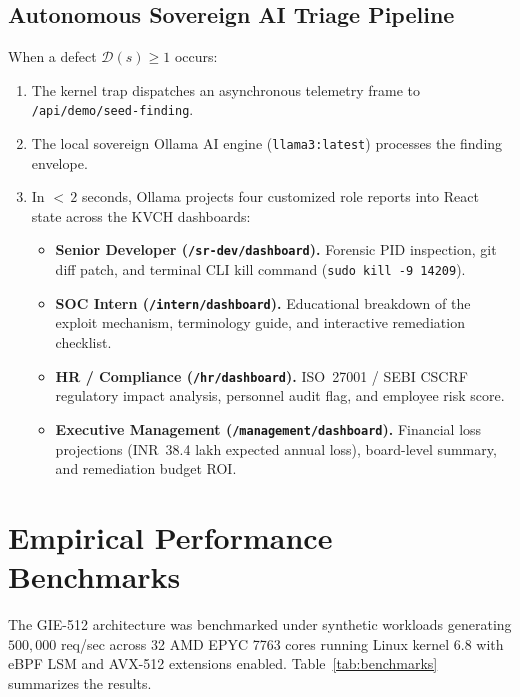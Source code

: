 \documentclass{portalciencia}
\theoremstyle{plain}
\theoremstyle{definition}
\begin{document}
\subsection{Autonomous Sovereign AI Triage Pipeline}

When a defect $\mathcal{D}(s) \ge 1$ occurs:
\begin{enumerate}
  \item The kernel trap dispatches an asynchronous telemetry frame to \texttt{/api/demo/seed-finding}.
  \item The local sovereign Ollama AI engine (\texttt{llama3:latest}) processes the finding envelope.
  \item In ${<}\,2$ seconds, Ollama projects four customized role reports into React state across the KVCH dashboards:
  \begin{itemize}
    \item \textbf{Senior Developer (\texttt{/sr-dev/dashboard}).} Forensic PID inspection, git diff patch, and terminal CLI kill command (\texttt{sudo kill -9 14209}).
    \item \textbf{SOC Intern (\texttt{/intern/dashboard}).} Educational breakdown of the exploit mechanism, terminology guide, and interactive remediation checklist.
    \item \textbf{HR / Compliance (\texttt{/hr/dashboard}).} ISO~27001 / SEBI CSCRF regulatory impact analysis, personnel audit flag, and employee risk score.
    \item \textbf{Executive Management (\texttt{/management/dashboard}).} Financial loss projections (INR~38.4 lakh expected annual loss), board-level summary, and remediation budget ROI.
  \end{itemize}
\end{enumerate}

\section{Empirical Performance Benchmarks}

The GIE-512 architecture was benchmarked under synthetic workloads generating $500{,}000$ req/sec across 32 AMD EPYC 7763 cores running Linux kernel 6.8 with eBPF LSM and AVX-512 extensions enabled. Table~\ref{tab:benchmarks} summarizes the results.
\end{document}
